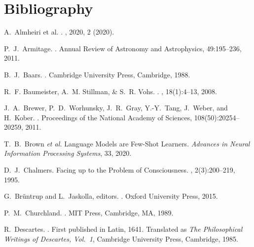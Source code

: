 \documentclass[12pt,a4paper]{article}
\begin{document}
\section*{Bibliography}
\singlespacing
\begin{thebibliography}{99}

A.~Almheiri et al.
.
, 2020, 2 (2020).

P.~J.~Armitage.
.
\newblock Annual Review of Astronomy and Astrophysics, 49:195--236, 2011.

B.~J.~Baars.
.
\newblock Cambridge University Press, Cambridge, 1988.

R.~F. Baumeister, A.~M. Stillman, \& S.~R. Vohs.
.
, 18(1):4--13, 2008.

J.~A.~Brewer, P.~D.~Worhunsky, J.~R.~Gray, Y.-Y.~Tang, J.~Weber, and H.~Kober.
.
\newblock Proceedings of the National Academy of Sciences, 108(50):20254--20259, 2011.

T.~B.~Brown \emph{et al.}
\newblock Language Models are Few-Shot Learners.
\newblock \emph{Advances in Neural Information Processing Systems}, 33, 2020.

D.~J.~Chalmers.
\newblock Facing up to the Problem of Consciousness.
, 2(3):200--219, 1995.

G.~Brüntrup and L.~Jaskolla, editors.
.
\newblock Oxford University Press, 2015.

P.~M.~Churchland.
.
\newblock MIT Press, Cambridge, MA, 1989.

R.~Descartes.
.
\newblock First published in Latin, 1641.
\newblock Translated as {\em The Philosophical Writings of Descartes, Vol.~1}, Cambridge University Press, Cambridge, 1985.


\end{thebibliography}
\end{document}
